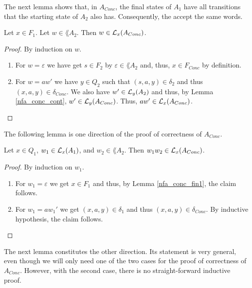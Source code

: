
The next lemma shows that, in $A_{Conc}$, the final states of $A_1$ have all transitions that the starting state of $A_2$ also has.
Consequently, the accept the same words.

\begin{lemma}
    \label{nfa_conc_fin1}
    Let $x \in F_1$. Let $w \in \lang{A_2}$. Then $w \in \mathcal{L}_{x}(A_{Conc})$.
\end{lemma}
\begin{proof}
    By induction on $w$. 
    \begin{enumerate}
        \item For $w = \varepsilon$ we have get $s \in F_2$ by $\varepsilon \in \lang{A_2}$ and, thus, $x \in F_{Conc}$ by definition.
        \item For $w = aw'$ we have $y \in Q_2$ such that $(s,a,y) \in \delta_2$ and thus $(x,a,y) \in \delta_{Conc}$.
            We also have $w' \in \mathcal{L}_{y}(A_2)$ and thus, by Lemma \ref{nfa_conc_cont}, $w' \in \mathcal{L}_{y}(A_{Conc})$.
            Thus, $aw' \in \mathcal{L}_{x}(A_{Conc})$.
    \end{enumerate}
\end{proof}


The following lemma is one direction of the proof of correctness of $A_{Conc}$.

\begin{lemma}
    \label{nfa_conc_aux2}
    Let $x \in Q_1$, $w_1 \in \mathcal{L}_{x}(A_1)$, and $w_2 \in \lang{A_2}$. Then $w_1 w_2 \in \mathcal{L}_{x}(A_{Conc})$.
\end{lemma}
\begin{proof}
    By induction on $w_1$.
    \begin{enumerate}
        \item For $w_1 = \varepsilon$ we get $x \in F_1$ and thus, by Lemma \ref{nfa_conc_fin1}, the claim follows.
        \item For $w_1 = aw_1'$ we get $(x,a,y) \in \delta_1$ and thus $(x,a,y) \in \delta_{Conc}$. By inductive hypothesis, the claim follows.
    \end{enumerate}
\end{proof}


The next lemma constitutes the other direction. 
Its statement is very general, even though we will only need one of the two cases for the proof of correctness of $A_{Conc}$.
However, with the second case, there is no straight-forward inductive proof.

